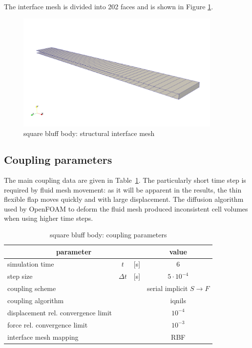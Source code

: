 The interface mesh is divided into 202 faces and is shown in Figure \ref{fig:sq_struct_mesh}. 

\begin{figure}[htbp!]
	\centering
	\includegraphics[width=0.9\textwidth, trim=0 50 0 200, clip]{images/sq-cyl/sq_struct_mesh.png}
	\caption{square bluff body: structural interface mesh}
	\label{fig:sq_struct_mesh}
\end{figure}


\subsection{Coupling parameters}

The main coupling data are given in Table~\ref{table:sq-coupling}. The particularly short time step is required by fluid mesh movement: as it will be apparent in the results, the thin flexible flap moves quickly and with large displacement. The diffusion algorithm used by OpenFOAM to deform the fluid mesh produced inconsistent cell volumes when using higher time steps. 

\begin{table}[!htb]
	\begin{center}
		\begin{tabular}{ l c  l| c } 
			\multicolumn{3}{c|}{parameter} & value   \\ 
			\hline
			simulation time  & $t$& [\si{s}] & 6      \\
			step size & $\Delta t$ & [\si{s}] & $5 \cdot 10^{-4}$   \\
			\hline
			coupling scheme & & & serial implicit  $S\rightarrow F$  \\
			coupling algorithm & & &  \acrshort{iqnils}  \\
			displacement rel. convergence limit & & & $10^{-4}$ \\
			force rel. convergence limit &&  & $10^{-3}$  \\
      		interface mesh mapping & & & RBF  \\
			
		\end{tabular}
	\end{center}
	\caption{square bluff body: coupling parameters}
	\label{table:sq-coupling}
\end{table}

